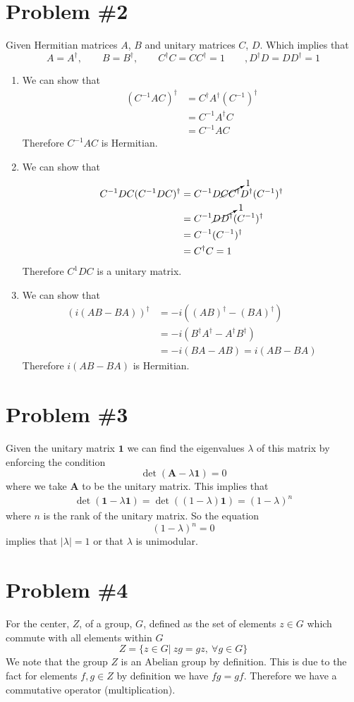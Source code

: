 \documentclass[11pt]{article}
\numberwithin{equation}{section}
\begin{document}
\section{Problem \#2}
Given Hermitian matrices $A$, $B$ and unitary matrices $C$, $D$. Which implies that
$$A=A^{\dagger},\qquad B=B^{\dagger},\qquad C^{\dagger}C=CC^{\dagger}=1 \qquad, D^{\dagger}D=DD^{\dagger} = 1$$
\begin{enumerate}[1)]
\item We can show that
\begin{align*}
(C^{-1}AC)^{\dagger} &= C^{\dagger}A^{\dagger}\left(C^{-1}\right)^{\dagger}\\
&= C^{-1}A^{\dagger}C\\
&= C^{-1}AC
\end{align*}
Therefore $C^{-1}AC$ is Hermitian.

\item We can show that
\begin{align*}
C^{-1}DC(C^{-1}DC)^{\dagger} &= C^{-1}D\cancelto{1}{CC^{\dagger}}D^{\dagger}(C^{-1})^{\dagger}\\
&= C^{-1}\cancelto{1}{DD^{\dagger}}(C^{-1})^{\dagger}\\
&= C^{-1}(C^{-1})^{\dagger}\\
&= C^{\dagger}C = 1
\end{align*}
Therefore $C^{1}DC$ is a unitary matrix.

\item We can show that
\begin{align*}
(i(AB-BA))^{\dagger} &= -i((AB)^{\dagger}-(BA)^{\dagger})\\
&= -i(B^{\dagger}A^{\dagger}-A^{\dagger}B^{\dagger})\\
&= -i(BA-AB) = i(AB-BA)
\end{align*}
Therefore $i(AB-BA)$ is Hermitian.
\end{enumerate}

\section{Problem \#3}
Given the unitary matrix $\mathbf{1}$ we can find the eigenvalues $\lambda$ of this matrix 
by enforcing the condition
$$\det(\mathbf{A}-\lambda\mathbf{1}) = 0$$
where we take $\mathbf{A}$ to be the unitary matrix. This implies that
\begin{align*}
\det(\mathbf{1}-\lambda\mathbf{1}) = \det((1-\lambda)\mathbf{1}) = (1-\lambda)^n
\end{align*}
where $n$ is the rank of the unitary matrix. So the equation 
$$(1-\lambda)^n=0$$
implies that $|\lambda|=1$ or that $\lambda$ is unimodular.

\pagebreak

\section{Problem \#4}
For the center, $Z$, of a group, $G$, defined as the set of elements $z\in{G}$ which commute
with all elements within $G$
$$Z = \{z\in{G}| \ zg=gz, \ \forall{g\in{G}}\}$$
We note that the group $Z$ is an Abelian group by definition. This is due to the fact for
elements $f,g\in{Z}$ by definition we have $fg=gf$. Therefore we have a commutative operator 
(multiplication).
\end{document}
